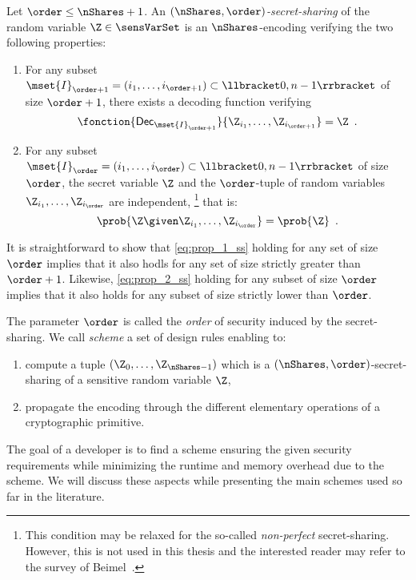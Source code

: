 \begin{definition}
    \label{def:secret_sharing}
    Let \(\order \leq \nShares+1\).
    An \emph{\((\nShares, \order)\)-secret-sharing} of the random variable \(\Z \in \sensVarSet\) is an \(\nShares\)-encoding verifying the two following properties:
    \begin{enumerate}
        \item For any subset \(\mset{I}_{\order+1} = (i_1, \ldots, i_{\order+1}) \subset \llbracket 0, n-1 \rrbracket\) of size \(\order+1\), there exists a decoding function verifying
        \begin{equation}
            \fonction{\mathsf{Dec}_{\mset{I}_{\order+1}}}{\Z_{i_1}, \ldots, \Z_{i_{\order+1}}} = \Z \enspace .
            \label{eq:prop_1_ss}
        \end{equation}
        \item For any subset \(\mset{I}_\order = (i_1, \ldots, i_{\order}) \subset \llbracket 0, n-1 \rrbracket\) of size \(\order\), the secret variable \(\Z\) and the \(\order\)-tuple of random variables \(\Z_{i_1}, \ldots, \Z_{i_{\order}}\) are independent,%
        \footnote{
            This condition may be relaxed for the so-called \emph{non-perfect} secret-sharing.
            However, this is not used in this thesis and the interested reader may refer to the survey of Beimel~\cite{amos_survey_2011}.
        }
        that is:
        \begin{equation}
            \prob{\Z \given \Z_{i_1}, \ldots, \Z_{i_{\order}}} = \prob{\Z} \enspace .
            \label{eq:prop_2_ss}
        \end{equation}
    \end{enumerate}
\end{definition}
\begin{remark}
    It is straightforward to show that \autoref{eq:prop_1_ss} holding for any set of size \(\order\) implies that it also hodls for any set of size strictly greater than \(\order+1\).
    Likewise, \autoref{eq:prop_2_ss} holding for any subset of size \(\order\) implies that it also holds for any subset of size strictly lower than \(\order\).
\end{remark}
%
The parameter \(\order\) is called the \emph{order} of security induced by the secret-sharing. 
We call \emph{scheme} a set of design rules enabling to:
\begin{enumerate}
    \item compute a tuple \((\Z_0, \ldots, \Z_{\nShares-1})\) which is a \((\nShares, \order)\)-secret-sharing of a sensitive random variable \(\Z\),
    \item  propagate the encoding through the different elementary operations of a cryptographic primitive.
\end{enumerate}
The goal of a developer is to find a scheme ensuring the given security requirements while minimizing the runtime and memory overhead due to the scheme.
We will discuss these aspects while presenting the main schemes used so far in the literature. 

